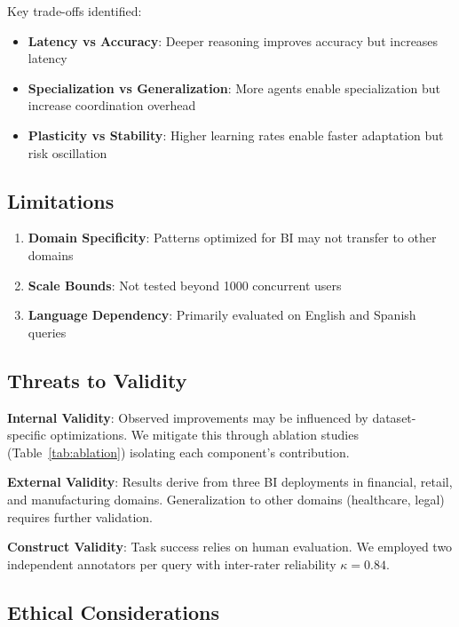 \documentclass[11pt,a4paper]{article}
\theoremstyle{definition}
\theoremstyle{remark}
\begin{document}
Key trade-offs identified:

\begin{itemize}
    \item \textbf{Latency vs Accuracy}: Deeper reasoning improves accuracy but increases latency
    \item \textbf{Specialization vs Generalization}: More agents enable specialization but increase coordination overhead
    \item \textbf{Plasticity vs Stability}: Higher learning rates enable faster adaptation but risk oscillation
\end{itemize}

\subsection{Limitations}

\begin{enumerate}
    \item \textbf{Domain Specificity}: Patterns optimized for BI may not transfer to other domains
    \item \textbf{Scale Bounds}: Not tested beyond 1000 concurrent users
    \item \textbf{Language Dependency}: Primarily evaluated on English and Spanish queries
\end{enumerate}

\subsection{Threats to Validity}

\textbf{Internal Validity}: Observed improvements may be influenced by dataset-specific optimizations. We mitigate this through ablation studies (Table~\ref{tab:ablation}) isolating each component's contribution.

\textbf{External Validity}: Results derive from three BI deployments in financial, retail, and manufacturing domains. Generalization to other domains (healthcare, legal) requires further validation.

\textbf{Construct Validity}: Task success relies on human evaluation. We employed two independent annotators per query with inter-rater reliability $\kappa = 0.84$.

\subsection{Ethical Considerations}
\end{document}
